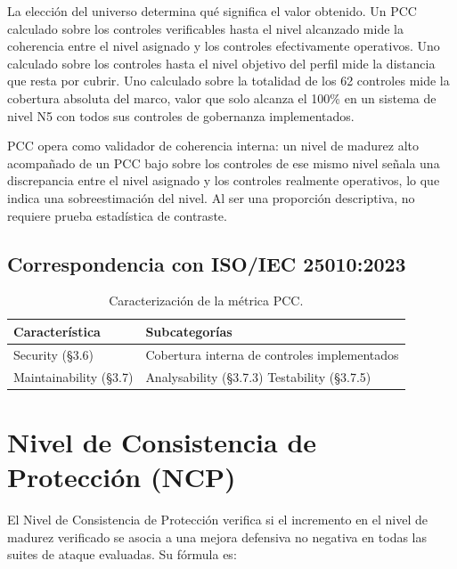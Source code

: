 La elección del universo determina qué significa el valor obtenido. Un PCC calculado sobre los controles verificables hasta el nivel alcanzado mide la coherencia entre el nivel asignado y los controles efectivamente operativos. Uno calculado sobre los controles hasta el nivel objetivo del perfil mide la distancia que resta por cubrir. Uno calculado sobre la totalidad de los 62 controles mide la cobertura absoluta del marco, valor que solo alcanza el 100\% en un sistema de nivel N5 con todos sus controles de gobernanza implementados.

PCC opera como validador de coherencia interna: un nivel de madurez alto acompañado de un PCC bajo sobre los controles de ese mismo nivel señala una discrepancia entre el nivel asignado y los controles realmente operativos, lo que indica una sobreestimación del nivel. Al ser una proporción descriptiva, no requiere prueba estadística de contraste.

\subsection{Correspondencia con ISO/IEC 25010:2023}

\begin{table}[H]
  \centering
  \caption{Caracterización de la métrica PCC.}
  \label{tab:caract-pcc}
  \renewcommand{\arraystretch}{1.4}
  \begin{tabular}{
    >{\raggedright\arraybackslash}m{4cm}
    >{\raggedright\arraybackslash}m{7.5cm}
  }
  \toprule
  \textbf{Característica} & \textbf{Subcategorías} \\
  \midrule
  Security (\S3.6) &
    Cobertura interna de controles implementados \\
  \addlinespace
  Maintainability (\S3.7) &
    Analysability (\S3.7.3) \newline
    Testability (\S3.7.5) \\
  \bottomrule
  \end{tabular}
\end{table}

\section{Nivel de Consistencia de Protección (NCP)}
\label{sec:ncp}

El Nivel de Consistencia de Protección verifica si el incremento en el
nivel de madurez verificado se asocia a una mejora defensiva no negativa
en todas las suites de ataque evaluadas. Su fórmula es:

